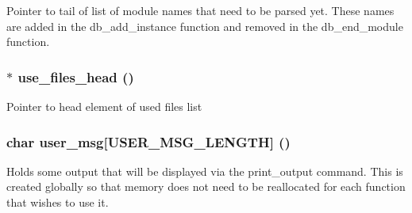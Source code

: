 Pointer to tail of list of module names that need to be parsed yet. These names are added in the db\_\-add\_\-instance function and removed in the db\_\-end\_\-module function. 
\subsubsection{$\ast$ {\bf use\_\-files\_\-head} ()}\label{parse_8c_a0}


Pointer to head element of used files list 
\subsubsection{\setlength{\rightskip}{0pt plus 5cm}char {\bf user\_\-msg}[USER\_\-MSG\_\-LENGTH] ()}\label{parse_8c_a3}


Holds some output that will be displayed via the print\_\-output command. This is created globally so that memory does not need to be reallocated for each function that wishes to use it. 